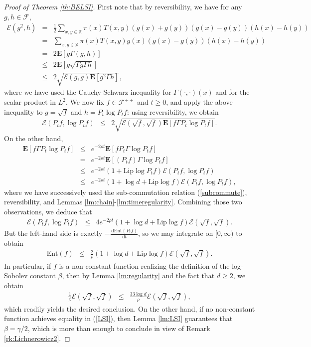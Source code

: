\documentclass[12pt,final]{article}
\numberwithin{equation}{section}
\newcommand{\Lip}{\mathrm {Lip}}
\newcommand{\bE}{{\mathbf{E}}}
\newcommand{\Ent}{\mathrm{Ent}}
\newcommand{\dd}{\,\mathrm{d}}
\newcommand{\cE}{\mathscr {E}}
\newcommand{\cF}{\mathcal {F}}
\newcommand{\dX}{\mathbb{X}}
\begin{document}
\begin{proof}[Proof of Theorem \ref{th:BELSI}]
First note that by reversibility, we have for any $g,h\in\cF$,
\begin{eqnarray*}
   \cE(g^2,h )%
   & = &\frac12 \sum_{x,y\in \dX} \pi(x)T(x,y)(g(x)+g(y))(g(x)-g(y))(h(x)-h(y)) \\
   & = & \sum_{x,y\in \dX} \pi(x)T(x,y)g(x)(g(x)-g(y))(h(x)-h(y))\\
   & = & 2\bE \left[g\Gamma(g,h)\right]\\
   & \le & 2\bE \left[g\sqrt{\Gamma g\Gamma h}\right]\\
   & \le & 2\sqrt{\cE(g,g){\bE\left[g^2\Gamma h\right]}},
\end{eqnarray*}
where we have used the Cauchy-Schwarz inequality for $\Gamma(\cdot,\cdot)(x)$ and for the scalar product in $L^2$.  
We now fix $f\in\cF^{++}$ and $t\ge 0$, and apply the above inequality to $g=\sqrt{f}$ and $h=P_t\log P_t f$: using reversibility, we obtain
\begin{eqnarray*}
\cE( P_t f,\log P_tf) & \le & 2\sqrt{\cE(\sqrt{f},\sqrt{f})\bE\left[f\Gamma P_t\log P_t f\right]}.\end{eqnarray*}
On the other hand, 
\begin{eqnarray*}
\bE\left[f\Gamma P_t\log P_t f\right] & \le & e^{-2\rho t}\bE\left[fP_t\Gamma\log P_t f\right]\\
& = & e^{-2\rho t}\bE\left[(P_tf)\Gamma \log P_t f\right]\\
& \le & e^{-2\rho t}\left(1+\Lip \log P_tf\right)\cE(P_tf,\log P_tf)\\
& \le & e^{-2\rho t}\left(1+\log d+\Lip \log f\right)\cE(P_tf,\log P_tf),
\end{eqnarray*}
where we have successively used the sub-commutation relation (\ref{subcommute}), reversibility, and   Lemmas \ref{lm:chain}-\ref{lm:timeregularity}. Combining those two observations, we deduce that
\begin{eqnarray*}
\cE( P_t f,\log P_tf) & \le & 4e^{-2\rho t}\left(1+\log d+\Lip\log f\right)\cE(\sqrt{f},\sqrt{f}).
\end{eqnarray*}
But the left-hand side is exactly $-\frac{\dd\Ent(P_t f)}{\dd t}$, so we may integrate on $[0,\infty)$ to obtain
\begin{eqnarray*}
       \Ent(f) & \le & \frac{2}{\rho}\left(1+\log d+\Lip\log f\right)\cE(\sqrt{f},\sqrt{f}).
\end{eqnarray*}
In particular, if $f$ is a non-constant function realizing the definition  of the log-Sobolev constant $\beta$, then by Lemma \ref{lm:regularity} and the fact that $d\ge 2$, we obtain
\begin{eqnarray*}
\frac{1}{\beta}\cE(\sqrt{f},\sqrt{f}) & \le & \frac{33\log d}{\rho}\cE(\sqrt{f},\sqrt{f}),
\end{eqnarray*}
which readily yields the desired conclusion. On the other hand, if no non-constant function achieves equality in (\ref{LSI}), then Lemma \ref{lm:LSI} guarantees that $\beta=\gamma/2$, which  is more than enough to conclude in view of Remark \ref{rk:Lichnerowicz2}.
\end{proof}
\end{document}
